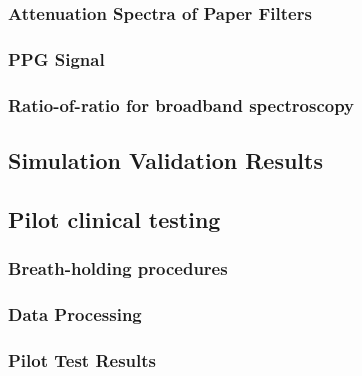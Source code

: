         \subsubsection{Attenuation Spectra of Paper Filters}
        \subsubsection{PPG Signal}
        \subsubsection{Ratio-of-ratio for broadband spectroscopy}
    \subsection{Simulation Validation Results}
    \subsection{Pilot clinical testing}
        \subsubsection{Breath-holding procedures}
        \subsubsection{Data Processing}
        \subsubsection{Pilot Test Results}



